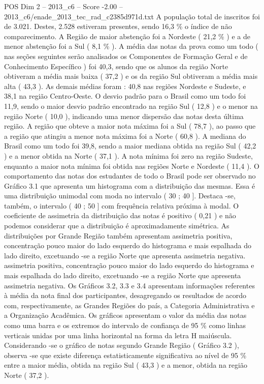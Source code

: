 \begin{textsample}{POS Dim 2 – 2013\_c6 – Score -2.00 – 2013\_c6/enade\_2013\_tec\_rad\_c2385d971d.txt}
A população total de inscritos foi de 3.021.
Destes, 2.528 estiveram presentes, sendo 16,3 \% o índice de não comparecimento.
A Região de maior abstenção foi a Nordeste ( 21,2 \% ) e a de menor abstenção foi a Sul ( 8,1 \% ).
A média das notas da prova como um todo ( nas seções seguintes serão analisados os Componentes de Formação Geral e de Conhecimento Específico ) foi 40,3, sendo que os alunos da região Norte obtiveram a média mais baixa ( 37,2 ) e os da região Sul obtiveram a média mais alta ( 43,3 ).
As demais médias foram : 40,8 nas regiões Nordeste e Sudeste, e 38,1 na região Centro-Oeste.
O desvio padrão para o Brasil como um todo foi 11,9, sendo o maior desvio padrão encontrado na região Sul ( 12,8 ) e o menor na região Norte ( 10,0 ), indicando uma menor dispersão das notas desta última região.
A região que obteve a maior nota máxima foi a Sul ( 78,7 ), ao passo que a região que atingiu a menor nota máxima foi a Norte ( 60,8 ).
A mediana do Brasil como um todo foi 39,8, sendo a maior mediana obtida na região Sul ( 42,2 ) e a menor obtida na Norte ( 37,1 ).
A nota mínima foi zero na região Sudeste, enquanto a maior nota mínima foi obtida nas regiões Norte e Nordeste ( 11,4 ).
O comportamento das notas dos estudantes de todo o Brasil pode ser observado no Gráfico 3.1 que apresenta um histograma com a distribuição das mesmas.
Essa é uma distribuição unimodal com moda no intervalo ( 30 ; 40 ].
Destaca -se, também, o intervalo ( 40 ; 50 ] com frequência relativa próxima à modal.
O coeficiente de assimetria da distribuição das notas é positivo ( 0,21 ) e não podemos considerar que a distribuição é aproximadamente simétrica.
As distribuições por Grande Região também apresentam assimetria positiva, concentração pouco maior do lado esquerdo do histograma e mais espalhada do lado direito, excetuando -se a região Norte que apresenta assimetria negativa. assimetria positiva, concentração pouco maior do lado esquerdo do histograma e mais espalhada do lado direito, excetuando -se a região Norte que apresenta assimetria negativa.
Os Gráficos 3.2, 3.3 e 3.4 apresentam informações referentes à média da nota final dos participantes, desagregando os resultados de acordo com, respectivamente, as Grandes Regiões do país, a Categoria Administrativa e a Organização Acadêmica.
Os gráficos apresentam o valor da média das notas como uma barra e os extremos do intervalo de confiança de 95 \% como linhas verticais unidas por uma linha horizontal na forma da letra H maiúscula.
Considerando -se o gráfico de notas segundo Grande Região ( Gráfico 3.2 ), observa -se que existe diferença estatisticamente significativa ao nível de 95 \% entre a maior média, obtida na região Sul ( 43,3 ) e a menor, obtida na região Norte ( 37,2 ).

\end{textsample}
